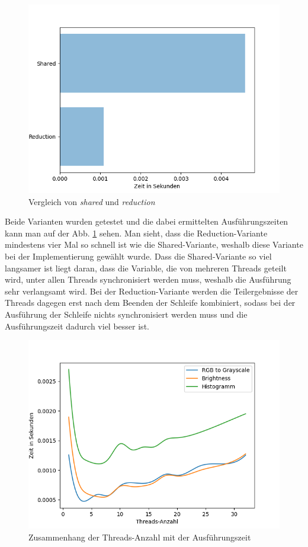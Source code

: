 \documentclass[11pt]{amsart}
\begin{document}
 \begin{figure}
\includegraphics[scale=0.6]{images/sharedVSreduction.png}
\caption{Vergleich von \textit{shared} und \textit{reduction}}
\label{fig:sharedVSreduction}
\end{figure}

Beide Varianten wurden getestet und die dabei ermittelten Ausführungszeiten kann man auf der Abb. \ref{fig:sharedVSreduction} sehen. Man sieht, dass die Reduction-Variante mindestens vier Mal so schnell ist wie die Shared-Variante, weshalb diese Variante bei der Implementierung gewählt wurde. Dass die Shared-Variante so viel langsamer ist liegt daran, dass die Variable, die von mehreren Threads geteilt wird, unter allen Threads synchronisiert werden muss, weshalb die Ausführung sehr verlangsamt wird. Bei der Reduction-Variante werden die Teilergebnisse der Threads dagegen erst nach dem Beenden der Schleife kombiniert, sodass bei der Ausführung der Schleife nichts synchronisiert werden muss und die Ausführungszeit dadurch viel besser ist. 






 \begin{figure}[thb!]
\includegraphics[scale=0.6]{images/threadsNumber.png}
\caption{Zusammenhang der Threads-Anzahl mit der Ausführungszeit}
\label{fig:threadsNumber}
\end{figure}
\end{document}
